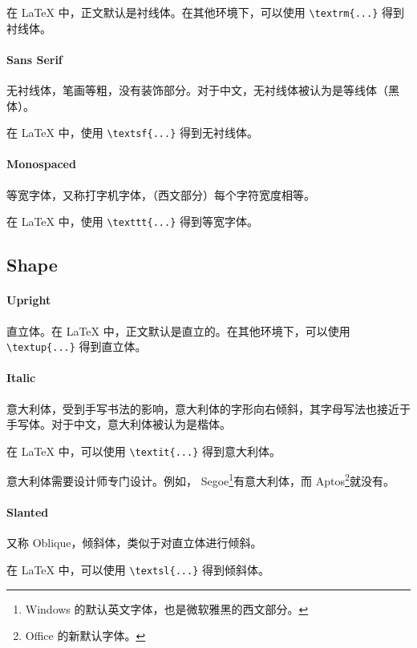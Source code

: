 \documentclass[a4paper,fontset=none]{ctexart}
\begin{document}
在 LaTeX 中，正文默认是衬线体。在其他环境下，可以使用 \verb|\textrm{...}| 得到衬线体。

\paragraph{Sans Serif}

无衬线体，笔画等粗，没有装饰部分。对于中文，无衬线体被认为是等线体（黑体）。

在 LaTeX 中，使用 \verb|\textsf{...}| 得到无衬线体。

\paragraph{Monospaced}

等宽字体，又称打字机字体，（西文部分）每个字符宽度相等。

在 LaTeX 中，使用 \verb|\texttt{...}| 得到等宽字体。

\subsection{Shape}

\paragraph{Upright}

直立体。在 LaTeX 中，正文默认是直立的。在其他环境下，可以使用 \verb|\textup{...}| 得到直立体。

\paragraph{Italic}

意大利体，受到手写书法的影响，意大利体的字形向右倾斜，其字母写法也接近于手写体。对于中文，意大利体被认为是楷体。

在 LaTeX 中，可以使用 \verb|\textit{...}| 得到意大利体。

意大利体需要设计师专门设计。例如， Segoe\footnote{Windows 的默认英文字体，也是微软雅黑的西文部分。}有意大利体，而 Aptos\footnote{Office 的新默认字体。}就没有。

\paragraph{Slanted}

又称 Oblique，倾斜体，类似于对直立体进行倾斜。

在 LaTeX 中，可以使用 \verb|\textsl{...}| 得到倾斜体。
\end{document}
